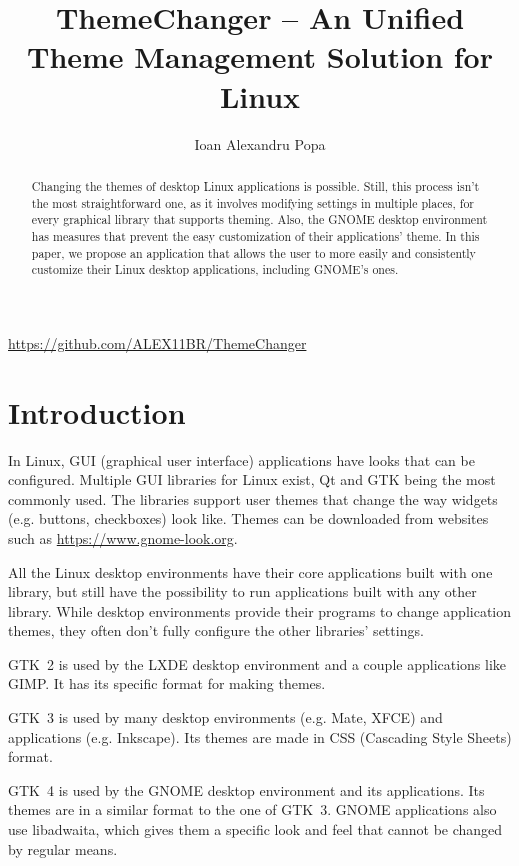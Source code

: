\documentclass{article}
\title{ThemeChanger -- An Unified Theme Management Solution for Linux}
\author{Ioan Alexandru Popa}
\begin{document}
\maketitle

\begin{center}
    \url{https://github.com/ALEX11BR/ThemeChanger}
\end{center}

\begin{abstract}
    Changing the themes of desktop Linux applications is possible.
    Still, this process isn't the most straightforward one, as it involves modifying settings in multiple places, for every graphical library that supports theming.
    Also, the GNOME desktop environment has measures that prevent the easy customization of their applications' theme.
    In this paper, we propose an application that allows the user to more easily and consistently customize their Linux desktop applications, including GNOME's ones.
\end{abstract}

\section{Introduction}
In Linux, GUI (graphical user interface) applications have looks that can be configured.
Multiple GUI libraries for Linux exist, Qt and GTK being the most commonly used\cite{popcon}.
The libraries support user themes that change the way widgets (e.g. buttons, checkboxes) look like.
Themes can be downloaded from websites such as \url{https://www.gnome-look.org}.

All the Linux desktop environments have their core applications built with one library, but still have the possibility to run applications built with any other library.
While desktop environments provide their programs to change application themes, they often don't fully configure the other libraries' settings.

GTK~2 is used by the LXDE desktop environment and a couple applications like GIMP.
It has its specific format\cite{gtk2guide} for making themes.

GTK~3 is used by many desktop environments (e.g. Mate, XFCE) and applications (e.g. Inkscape).
Its themes are made in CSS (Cascading Style Sheets) format.

GTK~4 is used by the GNOME desktop environment and its applications.
Its themes are in a similar format to the one of GTK~3.
GNOME applications also use libadwaita, which gives them a specific look and feel that cannot be changed by regular means.
\end{document}

